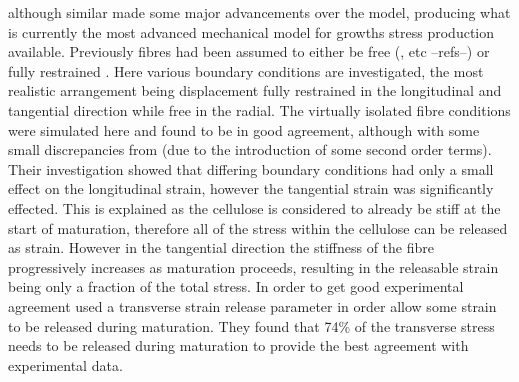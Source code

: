 \cite{Alm_ras_2005}
although similar made some major advancements over the \cite{Yamamoto_1998} model,
producing what is currently the most advanced mechanical model for growths
stress production available. Previously fibres had been assumed to either be
free (\cite{Yamamoto_1998}, etc --refs--) or fully restrained \cite{archer1987}\cite{archer1989}. Here
various boundary conditions are investigated, the most realistic arrangement being
displacement fully restrained in the longitudinal and tangential direction while
free in the radial. The virtually isolated fibre conditions were simulated here
and found to be in good agreement, although with some small discrepancies from
\cite{Yamamoto_1998} (due to the introduction of some second order terms).  Their
investigation showed that differing boundary conditions had only a small effect
on the longitudinal strain, however the tangential strain was significantly
effected. This is explained as the cellulose is considered to already be stiff at
the start of maturation, therefore all of the stress within the cellulose can be
released as strain. However in the tangential direction the stiffness of the
fibre progressively increases as maturation proceeds, resulting in the
releasable strain being only a fraction of the total stress. In order to get good
experimental agreement \cite{Alm_ras_2005} used a transverse strain release
parameter in order allow some strain to be released during maturation. They
found that 74\% of the transverse stress needs to be released during maturation
to provide the best agreement with experimental data.
